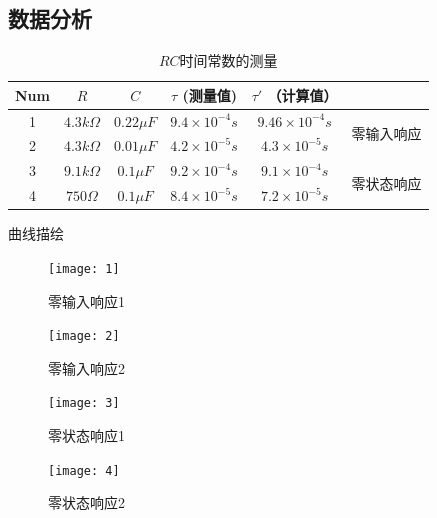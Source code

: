 \documentclass{../source/Experiment}
\begin{document}
        \subsection{数据分析}
        \begin{table}[htbp]
            \centering
            \caption{$RC$时间常数的测量}
            \begin{tabular}{c|c|c|c|c|c}
                    \hline
                    Num & $R$   & $C$    & $\tau$ (测量值)   & $\tau '$ （计算值） &                        \\ \hline
                    1 & $4.3k\Omega$ & $0.22\mu F$ & $9.4\times 10^{-4}s$ & $9.46\times 10^{-4}s$ & \multirow{2}{*}{零输入响应} \\ \cline{1-4}
                    2 & $4.3k\Omega$ & $0.01\mu F$ & $4.2\times 10^{-5}s$ & $4.3\times 10^{-5}s$ &                        \\ \hline
                    3 & $9.1k\Omega$ & $0.1\mu F$ & $9.2\times 10^{-4}s$ & $9.1\times 10^{-4}s$ & \multirow{2}{*}{零状态响应} \\ \cline{1-4}
                    4 & $750\Omega$ & $0.1\mu F$ & $8.4\times 10^{-5}s$ & $7.2\times 10^{-5}s$ &                        \\ \hline
            \end{tabular}
        \end{table}
        \par 
        曲线描绘\\
        \begin{figure}[htbp]          
                \begin{minipage}[t]{0.5\textwidth}
                    \centering
                    \texttt{[image: 1]}
                    \caption{零输入响应1}
                \end{minipage}
                \quad
                \begin{minipage}[t]{0.5\textwidth}
                    \centering
                    \texttt{[image: 2]}
                    \caption{零输入响应2}
                \end{minipage}
                \quad 
                \begin{minipage}[t]{0.5\textwidth}
                    \centering
                    \texttt{[image: 3]}
                    \caption{零状态响应1}
                \end{minipage}
                \quad 
                \begin{minipage}[t]{0.5\textwidth}
                    \centering
                    \texttt{[image: 4]}
                    \caption{零状态响应2}
                \end{minipage}
            \end{figure}
\end{document}
